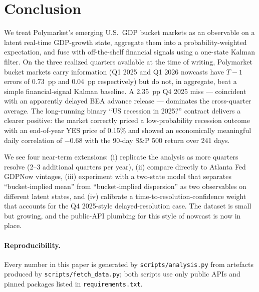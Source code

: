 \documentclass{article}
\begin{document}
\section{Conclusion}
\label{sec:concl}

We treat Polymarket's emerging U.S.\ GDP bucket markets as an observable on a latent
real-time GDP-growth state, aggregate them into a probability-weighted expectation, and
fuse with off-the-shelf financial signals using a one-state Kalman filter. On the three
realized quarters available at the time of writing, Polymarket bucket markets carry
information (Q1 2025 and Q1 2026 nowcasts have $T{-}1$ errors of 0.73~pp and 0.04~pp
respectively) but do not, in aggregate, beat a simple financial-signal Kalman baseline.
A 2.35~pp Q4 2025 miss --- coincident with an apparently delayed BEA advance release ---
dominates the cross-quarter average. The long-running binary ``US recession in 2025?''
contract delivers a clearer positive: the market correctly priced a low-probability
recession outcome with an end-of-year YES price of 0.15\% and showed an economically
meaningful daily correlation of $-0.68$ with the 90-day S\&P 500 return over 241 days.

We see four near-term extensions: (i) replicate the analysis as more quarters resolve
(2--3 additional quarters per year), (ii) compare directly to Atlanta Fed GDPNow vintages,
(iii) experiment with a two-state model that separates ``bucket-implied mean'' from
``bucket-implied dispersion'' as two observables on different latent states, and (iv)
calibrate a time-to-resolution-confidence weight that accounts for the Q4 2025-style
delayed-resolution case. The dataset is small but growing, and the public-API plumbing for
this style of nowcast is now in place.

\paragraph{Reproducibility.} Every number in this paper is generated by
\texttt{scripts/analysis.py} from artefacts produced by \texttt{scripts/fetch\_data.py};
both scripts use only public APIs and pinned packages listed in \texttt{requirements.txt}.



\end{document}
